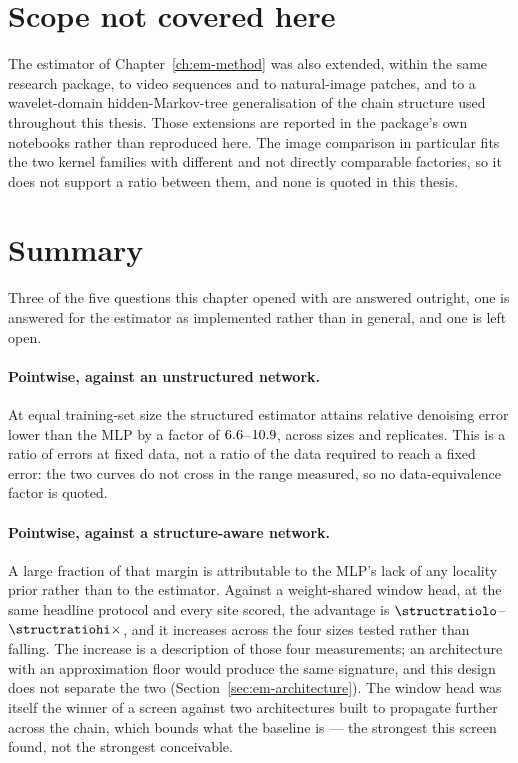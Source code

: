 \section{Scope not covered here}

The estimator of Chapter~\ref{ch:em-method} was also extended, within the
same research package, to video sequences and to natural-image patches, and
to a wavelet-domain hidden-Markov-tree generalisation of the chain structure
used throughout this thesis. Those extensions are reported in the package's
own notebooks rather than reproduced here. The image comparison in
particular fits the two kernel families with different and not directly
comparable factories, so it does not support a ratio between them, and none
is quoted in this thesis.

\section{Summary}

Three of the five questions this chapter opened with are answered outright, one
is answered for the estimator as implemented rather than in general, and one is
left open.

\paragraph{Pointwise, against an unstructured network.} At equal training-set
size the structured estimator attains relative denoising error lower than the
MLP by a factor of $6.6$--$10.9$, across \nsizesused{} sizes and
\nseedsused{} replicates. This is a ratio of errors at fixed data, not a ratio
of the data required to reach a fixed error: the two curves do not cross in the
range measured, so no data-equivalence factor is quoted.

\paragraph{Pointwise, against a structure-aware network.} A large fraction of
that margin is attributable to the MLP's lack of any locality prior rather than
to the estimator. Against a weight-shared window head, at the same headline
protocol and every site scored, the advantage is
$\structratiolo$--$\structratiohi\times$, and it increases across the four sizes
tested rather than falling. The increase is a description of those four
measurements; an architecture with an approximation floor would produce the same
signature, and this design does not separate the two
(Section~\ref{sec:em-architecture}). The window head was itself the winner of a
screen against two architectures built to propagate further across the chain,
which bounds what the baseline is --- the strongest this screen found, not the
strongest conceivable.

